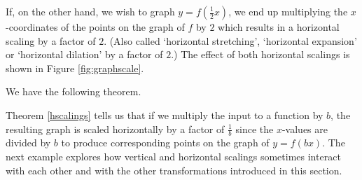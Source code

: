 If, on the other hand, we wish to graph $y = f\left( \frac{1}{2} x\right)$, we end up multiplying the $x$-coordinates of the points on the graph of $f$ by $2$ which results in a horizontal scaling by a factor of $2$. (Also called `horizontal stretching', `horizontal expansion' or `horizontal dilation' by a factor of $2$.) The effect of both horizontal scalings is shown in Figure \ref{fig:graphscale}.


We have the following theorem.

\medskip


\medskip

Theorem \ref{hscalings} tells us that if we multiply the input to a function by $b$, the resulting graph is scaled horizontally by a factor of $\frac{1}{b}$ since the $x$-values are divided by $b$ to produce corresponding points on the graph of $y = f(bx)$.    The next example explores how vertical and horizontal scalings sometimes interact with each other and with the other transformations introduced in this section. 

\medskip

